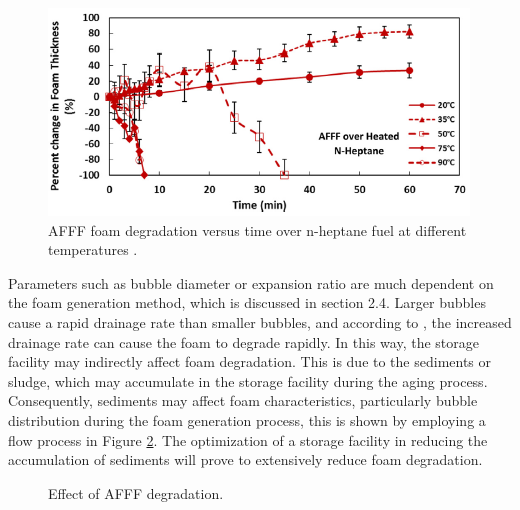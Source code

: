 \documentclass[12pt]{report}
\begin{document}
\begin{figure}[H]
    \centering
    \includegraphics[width=\textwidth]{foam_degradation.png}
    \caption{AFFF foam degradation versus time over n-heptane fuel at different temperatures \cite{hinnant2017influence}.}
    \label{ch2:figure:degradation}
\end{figure}

Parameters such as bubble diameter or expansion ratio are much dependent on the foam generation method, which is discussed in section 2.4. Larger bubbles cause a rapid drainage rate than smaller bubbles, and according to \cite{hinnant2017influence}, the increased drainage rate can cause the foam to degrade rapidly. In this way, the storage facility may indirectly affect foam degradation. This is due to the sediments or sludge, which may accumulate in the storage facility during the aging process. Consequently, sediments may affect foam characteristics, particularly bubble distribution during the foam generation process, this is shown by employing a flow process in Figure \ref{ch2:figure:effect}. The optimization of a storage facility in reducing the accumulation of sediments will prove to extensively reduce foam degradation.

\begin{figure}[H]

\centering
\begin{adjustbox}{center}
\end{adjustbox}

\caption{Effect of AFFF degradation.}
\label{ch2:figure:effect}
\end{figure}
\end{document}
